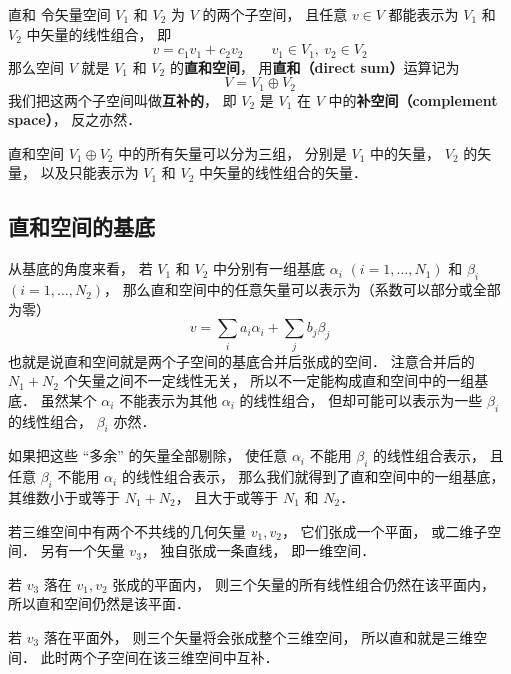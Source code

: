 
\begin{definition}{直和}
令矢量空间 $V_1$ 和 $V_2$ 为 $V$ 的两个子空间， 且任意 ${v} \in V$ 都能表示为 $V_1$ 和 $V_2$ 中矢量的线性组合， 即
\begin{equation}
{v} = c_1 {v_1} + c_2 {v_2}
\qquad
{v_1} \in V_1,\ {v_2} \in V_2
\end{equation}
那么空间 $V$ 就是 $V_1$ 和 $V_2$ 的\textbf{直和空间}， 用\textbf{直和（direct sum）}运算记为
\begin{equation}
V = V_1 \oplus V_2
\end{equation}
我们把这两个子空间叫做\textbf{互补的}， 即 $V_2$ 是 $V_1$ 在 $V$ 中的\textbf{补空间（complement space）}， 反之亦然．
\end{definition}

直和空间 $V_1 \oplus V_2$ 中的所有矢量可以分为三组， 分别是 $V_1$ 中的矢量， $V_2$ 的矢量， 以及只能表示为 $V_1$ 和 $V_2$ 中矢量的线性组合的矢量．

\subsection{直和空间的基底}
从基底的角度来看， 若 $V_1$ 和 $V_2$ 中分别有一组基底 ${\alpha_i}$ $(i = 1, \dots, N_1)$ 和 ${\beta_i}$ $(i = 1, \dots, N_2)$， 那么直和空间中的任意矢量可以表示为（系数可以部分或全部为零）
\begin{equation}
{v} = \sum_i a_i {\alpha_i} + \sum_j b_j {\beta_j}
\end{equation}
也就是说直和空间就是两个子空间的基底合并后张成的空间． 注意合并后的 $N_1 + N_2$ 个矢量之间不一定线性无关， 所以不一定能构成直和空间中的一组基底． 虽然某个 ${\alpha_i}$ 不能表示为其他 ${\alpha_i}$ 的线性组合， 但却可能可以表示为一些 ${\beta_i}$ 的线性组合， ${\beta_i}$ 亦然．

如果把这些 “多余” 的矢量全部剔除， 使任意 ${\alpha_i}$ 不能用 ${\beta_i}$ 的线性组合表示， 且任意 ${\beta_i}$ 不能用 ${\alpha_i}$ 的线性组合表示， 那么我们就得到了直和空间中的一组基底， 其维数小于或等于 $N_1 + N_2$， 且大于或等于 $N_1$ 和 $N_2$．

\begin{example}{}\label{DirSum_ex1}
若三维空间中有两个不共线的几何矢量 ${v_1}, {v_2}$， 它们张成一个平面， 或二维子空间． 另有一个矢量 ${v_3}$， 独自张成一条直线， 即一维空间．

若 ${v_3}$ 落在 ${v_1}, {v_2}$ 张成的平面内， 则三个矢量的所有线性组合仍然在该平面内， 所以直和空间仍然是该平面．

若 ${v_3}$ 落在平面外， 则三个矢量将会张成整个三维空间， 所以直和就是三维空间． 此时两个子空间在该三维空间中互补．
\end{example}

